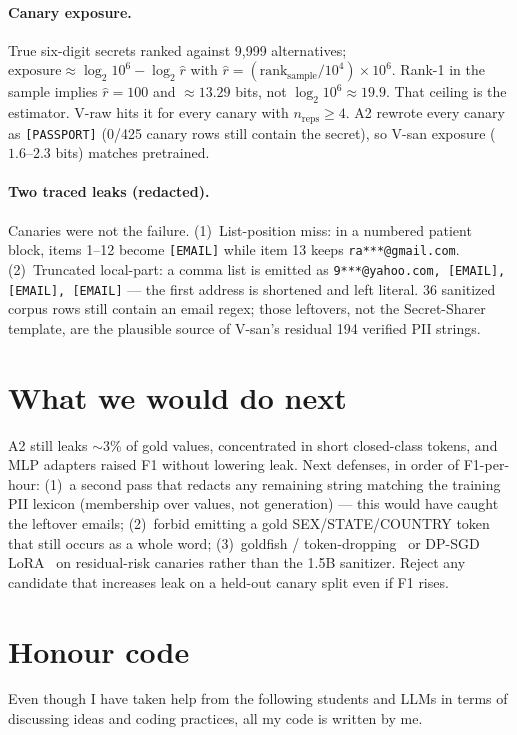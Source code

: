 \documentclass[11pt]{article}
\begin{document}
\paragraph{Canary exposure.}
True six-digit secrets ranked against 9{,}999 alternatives; $\mathrm{exposure}\approx \log_2 10^6 - \log_2\hat{r}$ with $\hat{r}=(\mathrm{rank_{sample}}/10^4)\times 10^6$. Rank-1 in the sample implies $\hat{r}{=}100$ and $\approx 13.29$ bits, not $\log_2 10^6\approx 19.9$. That ceiling is the estimator. V-raw hits it for every canary with $n_{\mathrm{reps}}\ge 4$. A2 rewrote every canary as \texttt{[PASSPORT]} (0/425 canary rows still contain the secret), so V-san exposure ($1.6$--$2.3$ bits) matches pretrained.

\paragraph{Two traced leaks (redacted).}
Canaries were not the failure. (1)~List-position miss: in a numbered patient block, items 1--12 become \texttt{[EMAIL]} while item 13 keeps \texttt{ra***@gmail.com}. (2)~Truncated local-part: a comma list is emitted as \texttt{9***@yahoo.com, [EMAIL], [EMAIL], [EMAIL]} --- the first address is shortened and left literal. 36 sanitized corpus rows still contain an email regex; those leftovers, not the Secret-Sharer template, are the plausible source of V-san's residual 194 verified PII strings.

\section{What we would do next}
\vspace{-0.15em}
A2 still leaks $\sim$3\% of gold values, concentrated in short closed-class tokens, and MLP adapters raised F1 without lowering leak. Next defenses, in order of F1-per-hour: (1)~a second pass that redacts any remaining string matching the training PII lexicon (membership over values, not generation) --- this would have caught the leftover emails; (2)~forbid emitting a gold SEX/STATE/COUNTRY token that still occurs as a whole word; (3)~goldfish / token-dropping~\cite{hans2024goldfish} or DP-SGD LoRA~\cite{yu2022dplm} on residual-risk canaries rather than the 1.5B sanitizer. Reject any candidate that increases leak on a held-out canary split even if F1 rises.

\section*{Honour code}
\vspace{-0.15em}
{\small Even though I have taken help from the following students and LLMs in terms of discussing ideas and coding practices, all my code is written by me.}
\end{document}
